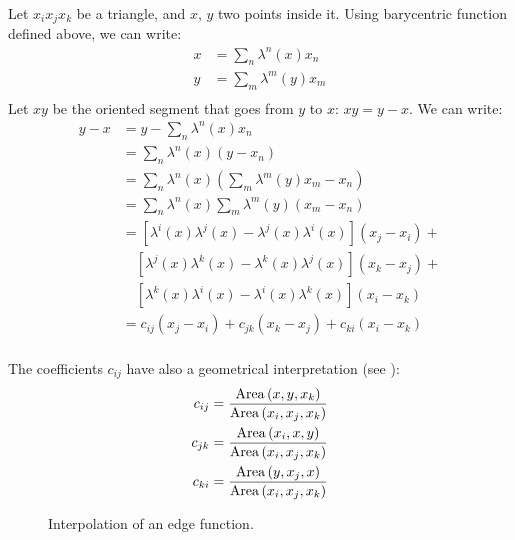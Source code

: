 Let $x_i x_j x_k$ be a triangle, and $x$, $y$ two points inside
it. Using barycentric function defined above, we can write:
\begin{align*}
x & = \sum_n \lambda^n\left(x\right) x_n \\
y & = \sum_m \lambda^m\left(y\right) x_m \\
\end{align*}
Let $xy$ be the oriented segment that goes from $y$ to $x$: $xy = y -
x$. We can write:
\begin{equation*} \begin{split}
y - x & = y - \sum_n \lambda^n\left(x\right) x_n \\
      & = \sum_n \lambda^n\left(x\right) \left(y - x_n\right) \\
      & = \sum_n \lambda^n\left(x\right) \left(\sum_m \lambda^m\left(y\right) x_m - x_n\right) \\
      & = \sum_n \lambda^n\left(x\right) \sum_m \lambda^m\left(y\right) \left(x_m - x_n\right) \\
      & = \left[ \lambda^i\left(x\right)\lambda^j\left(x\right) - \lambda^j\left(x\right)\lambda^i\left(x\right) \right] \left(x_j - x_i\right) + \\
  & \quad \left[ \lambda^j\left(x\right)\lambda^k\left(x\right) - \lambda^k\left(x\right)\lambda^j\left(x\right) \right] \left(x_k - x_j\right) + \\
  & \quad \left[ \lambda^k\left(x\right)\lambda^i\left(x\right) - \lambda^i\left(x\right)\lambda^k\left(x\right) \right] \left(x_i - x_k\right) \\
      & = c_{ij} \left(x_j - x_i\right) + c_{jk} \left(x_k - x_j\right) + c_{ki} \left(x_i - x_k\right) \\
\end{split} \end{equation*}

The coefficients $c_{ij}$ have also a geometrical interpretation (see
):
\begin{align*}
c_{ij} & = \frac{\operatorname{Area}\left(x,y,x_k\right)}{\operatorname{Area}\left(x_i,x_j,x_k\right)} \\
c_{jk} & = \frac{\operatorname{Area}\left(x_i,x,y\right)}{\operatorname{Area}\left(x_i,x_j,x_k\right)} \\
c_{ki} & = \frac{\operatorname{Area}\left(y,x_j,x\right)}{\operatorname{Area}\left(x_i,x_j,x_k\right)} \\
\end{align*}

\begin{figure}[htbp]
  \begin{center}
    \resizebox{6cm}{!}{}
  \end{center}
  \caption{Interpolation of an edge function.}
  \label{fig:edge_function_interpolation}
\end{figure}

